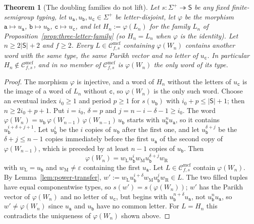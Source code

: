 \documentclass[11pt]{article}
\numberwithin{equation}{section}
\theoremstyle{plain}
\newtheorem{theorem}{Theorem}[section]
\theoremstyle{definition}
\theoremstyle{remark}
\newcommand{\Cmcf}[2]{\mathcal{C}^{\mathrm{mcf}}_{#1,#2}}
\newcommand{\eps}{\varepsilon}
\theoremstyle{plain}
\begin{document}
\begin{theorem}[The doubling families do not lift]
\label{thm:doubling-no-lift}
Let $s:\Sigma^+\twoheadrightarrow\mathsf S$ be any fixed finite-semigroup typing, let
$u_{\mathtt a},u_{\mathtt b},u_{\mathtt c}\in\Sigma^+$ be letter-disjoint, let $\varphi$ be the
morphism $\mathtt a\mapsto u_{\mathtt a}$, $\mathtt b\mapsto u_{\mathtt b}$,
$\mathtt c\mapsto u_{\mathtt c}$, and let $H_n:=\varphi(L_n)$
for the family $L_n$ of Proposition~\ref{prop:three-letter-family} \textup(so $H_n=L_n$
when $\varphi$ is the identity\textup).  Let $n\ge2|\mathsf S|+2$ and $f\ge2$.
Every $L\in\Cmcf{f}{s}$ containing $\varphi(W_n)$ contains another word with the same
type, the same Parikh vector and no letter of $u_{\mathtt c}$.  In particular
$H_n\notin\Cmcf{f}{s}$, and in no member of $\Cmcf{f}{s}$ is $\varphi(W_n)$ the only
word of its type.
\end{theorem}
\begin{proof}
The morphism $\varphi$ is injective, and a word of $H_n$ without the
letters of $u_{\mathtt c}$ is the image of a word of $L_n$ without $\mathtt c$, so
$\varphi(W_n)$ is the only such word.  Choose an eventual index $i_0\ge1$ and period
$p\ge1$ for $s(u_{\mathtt b})$ with $i_0+p\le|\mathsf S|+1$; then $n\ge2i_0+p+1$.  Put
$i=i_0$, $\delta=p$ and $j=n-i-\delta-1\ge i_0$.  The word
$\varphi(W_n)=u_{\mathtt b}\,\varphi(W_{n-1})\,\varphi(W_{n-1})\,u_{\mathtt b}$ starts with
$u_{\mathtt b}^nu_{\mathtt a}$, so it contains $u_{\mathtt b}^{i+\delta+j+1}$.  Let
$u_{\mathtt b}^i$ be the $i$ copies of $u_{\mathtt b}$ after the first one, and let
$u_{\mathtt b}^{\delta+j}$ be the $\delta+j\le n-1$ copies immediately before the first
$u_{\mathtt a}$ of the second copy of $\varphi(W_{n-1})$, which is preceded by at least
$n-1$ copies of $u_{\mathtt b}$.  Then
\[
 \varphi(W_n)=w_{\mathrm L}u_{\mathtt b}^i w_{\mathrm M}u_{\mathtt b}^{\delta+j}w_{\mathrm R}
\]
with $w_{\mathrm L}=u_{\mathtt b}$ and $w_{\mathrm M}\ne\eps$ containing the first
$u_{\mathtt a}$.  Let $L\in\Cmcf{f}{s}$ contain $\varphi(W_n)$.  By
Lemma~\ref{lem:power-transfer},
$w':=w_{\mathrm L}u_{\mathtt b}^{i+\delta}w_{\mathrm M}u_{\mathtt b}^jw_{\mathrm R}\in L$.  The
two filled tuples have equal componentwise types, so $s(w')=s(\varphi(W_n))$; $w'$ has
the Parikh vector of $\varphi(W_n)$ and no letter of $u_{\mathtt c}$, but begins with
$u_{\mathtt b}^{n+\delta}u_{\mathtt a}$, not $u_{\mathtt b}^nu_{\mathtt a}$, so
$w'\ne\varphi(W_n)$ since $u_{\mathtt a}$ and $u_{\mathtt b}$ have no common letter.  For
$L=H_n$ this contradicts the uniqueness of $\varphi(W_n)$ shown above.
\end{proof}
\end{document}
